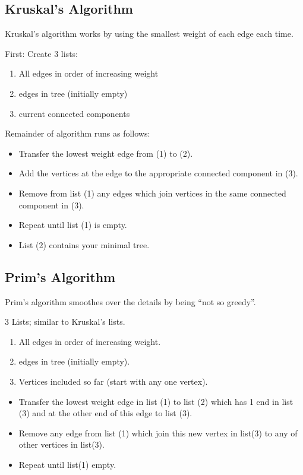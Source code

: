 \subsection{Kruskal's Algorithm}
Kruskal's algorithm works by using the smallest weight of each edge each time.

First: Create 3 lists:
\begin{enumerate}
  \item All edges in order of increasing weight
  \item edges in tree (initially empty)
  \item current connected components
\end{enumerate}

Remainder of algorithm runs as follows:
\begin{itemize}
  \item Transfer the lowest weight edge from (1) to (2).
  \item Add the vertices at the edge to the appropriate connected component in (3).
  \item Remove from list (1) any edges which join vertices in the same connected component in (3).
  \item Repeat until list (1) is empty.
  \item List (2) contains your minimal tree.
\end{itemize}


\subsection{Prim's Algorithm}
Prim's algorithm smoothes over the details by being ``not so greedy''.

3 Lists; similar to Kruskal's lists.
\begin{enumerate}
  \item All edges in order of increasing weight.
  \item edges in tree (initially empty).
  \item Vertices included so far (start with any one vertex).
\end{enumerate}

\begin{itemize}
  \item Transfer the lowest weight edge in list (1) to list (2) which has 1 end
  in list (3) and at the other end of this edge to list (3).
  \item Remove any edge from list (1) which join this new vertex in list(3) to any of other vertices in list(3).
  \item Repeat until list(1) empty.
\end{itemize}

